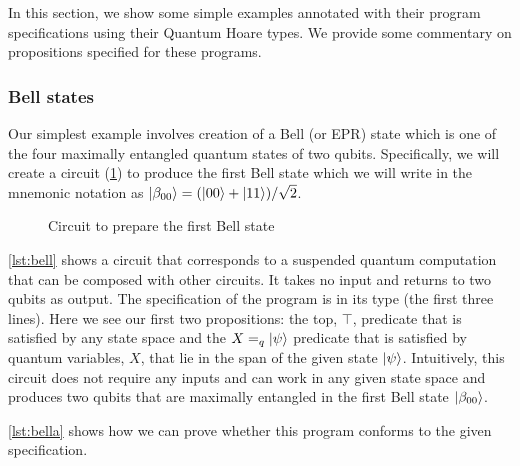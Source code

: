 \documentclass[adraft,creativecommons]{eptcs}
\theoremstyle{definition}
\theoremstyle{remark}
\begin{document}
In this section, we show some simple examples annotated with their program specifications using their Quantum Hoare types. We provide some commentary on propositions specified for these programs.

\subsubsection{Bell states}

Our simplest example involves creation of a Bell (or EPR) state which is one of the four maximally entangled quantum states of two qubits. Specifically, we will create a circuit (\cref{fig:bell00}) to produce the first Bell state which we will write in the mnemonic notation as $\ket{\beta_{00}} = (\ket{00}+\ket{11})/\sqrt{2}$.

\begin{figure}
    \centering
    \caption{Circuit to prepare the first Bell state}
    \label{fig:bell00}
\end{figure}



\cref{lst:bell} shows a circuit that corresponds to a suspended quantum computation that can be composed with other circuits. It takes no input and returns to two qubits as output. The specification of the program is in its type (the first three lines). Here we see our first two propositions: the top, $\top$, predicate that is satisfied by any state space and the $X =_q \ket{\psi}$ predicate that is satisfied by quantum variables, $X$, that lie in the span of the given state $\ket{\psi}$. Intuitively, this circuit does not require any inputs and can work in any given state space and produces two qubits that are maximally entangled in the first Bell state $\ket{\beta_{00}}$.

\cref{lst:bella} shows how we can prove whether this program conforms to the given specification.
\end{document}
